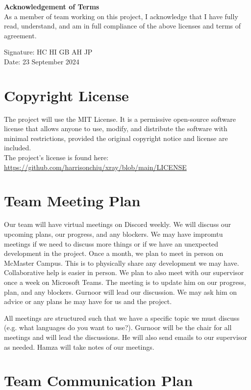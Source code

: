 \documentclass{article}
\begin{document}
\noindent
\textbf{Acknowledgement of Terms}\\
As a member of team working on this project, I acknowledge that I have fully read, understand, and
am in full compliance of the above licenses and terms of agreement.

\noindent
Signature: HC HI GB AH JP\\
Date: 23 September 2024

\section{Copyright License}

The project will use the MIT License. It is a permissive open-source software license that allows
anyone to use, modify, and distribute the software with minimal restrictions, provided the 
original copyright notice and license are included.\\

The project's license is found here: \url{https://github.com/harrisonchiu/xray/blob/main/LICENSE}

\section{Team Meeting Plan}

Our team will have virtual meetings on Discord weekly. We will discuss our upcoming plans, our 
progress, and any blockers. We may have impromtu meetings if we need to discuss more things or if
we have an unexpected development in the project. Once a month, we plan to meet in person on 
McMaster Campus. This is to physically share any development we may have. Collaborative help is 
easier in person. We plan to also meet with our supervisor once a week on Microsoft Teams. The 
meeting is to update him on our progress, plan, and any blockers. Gurnoor will lead our discussion.
We may ask him on advice or any plans he may have for us and the project.

All meetings are structured such that we have a specific topic we must discuss (e.g. what 
languages do you want to use?). Gurnoor will be the chair for all meetings and will lead the 
discussions. He will also send emails to our supervisor as needed. Hamza will take notes of our
meetings.

\section{Team Communication Plan}
\end{document}
